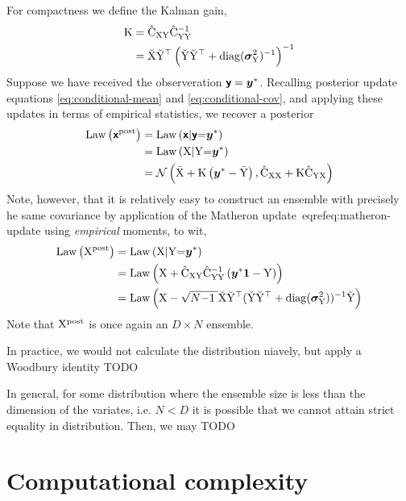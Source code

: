 \documentclass{article}
\begin{document}
For compactness we define the  Kalman gain,
\begin{align}
    \mathrm{K}
    &= \hat{\mathrm{C}}_{\mathrm{XY}} \hat{\mathrm{C}}_{\mathrm{YY}}^{-1}\\
    &=\breve{\mathrm{X}}\breve{\mathrm{Y}}^\top  \left(
        \breve{\mathrm{Y}}\breve{\mathrm{Y}}^\top+\operatorname{diag}(\boldsymbol{\sigma}^2_{\mathrm{Y}})^{-1}
    \right)^{-1}
    \label{eq:kalman_gain}
\end{align}
Suppose we have received the observeration $\boldsymbol{\mathsf{y}}=\boldsymbol{y}^*$.
Recalling posterior update equations \eqref{eq:conditional-mean} and \eqref{eq:conditional-cov}, and applying these updates in terms of empirical statistics, we recover a posterior
\begin{align}
    \operatorname{Law}\left(\boldsymbol{\mathsf{x}}^{\text{post}}\right)
    &=\operatorname{Law}\left(\boldsymbol{\mathsf{x}}|\boldsymbol{\mathsf{y}}{=}\boldsymbol{y}^*\right)\\
    &=\operatorname{Law}\left(\mathrm{X}|\mathrm{Y}{=}\boldsymbol{y}^*\right)\\
    &= \mathcal{N}\left(
        \bar{\mathrm{X}} +
        \mathrm{K}\left( \boldsymbol{y}^* - \bar{\mathrm{Y}}\right),
        \hat{\mathrm{C}}_{\mathrm{XX}} + \mathrm{K}\hat{\mathrm{C}}_{\mathrm{YX}}
        \right)
\end{align}
Note, however, that it is relatively easy to construct an ensemble with precisely he same covariance by application of the Matheron update~eqref{eq:matheron-update} using \emph{empirical} moments, to wit,
\begin{align}
    \operatorname{Law}\left(\mathrm{X}^{\text{post}}\right)
    &=\operatorname{Law}\left(\mathrm{X}|\mathrm{Y}{=}\boldsymbol{y}^*\right)\\
    &=\operatorname{Law}\left(\mathrm{X} + \hat{\mathrm{C}}_{\mathrm{XY}} \hat{\mathrm{C}}_{\mathrm{YY}}^{-1} \left( \boldsymbol{y}^*\boldsymbol{1} - \mathrm{Y} \right)\right)\\
    &=\operatorname{Law}\left(\mathrm{X} -\sqrt{N{-}1\;} \breve{\mathrm{X}}\breve{\mathrm{Y}}^\top (\breve{\mathrm{Y}}\breve{\mathrm{Y}}^\top+\operatorname{diag}(\boldsymbol{\sigma}^2_{\mathrm{Y}}))^{-1} \breve{\mathrm{Y}}\right)
\end{align}
Note that $\mathrm{X}^{\text{post}}$ is once again an $D \times N$ ensemble.

In practice, we would not calculate the distribution niavely, but apply a Woodbury identity TODO

In general, for some distribution where the ensemble size is less than the dimension of the variates, i.e. $N< D$ it is possible that we cannot attain strict equality in distribution.
Then, we may TODO
\citep{Sriperumbudur2010Hilbert}


\section{Computational complexity}
\end{document}

